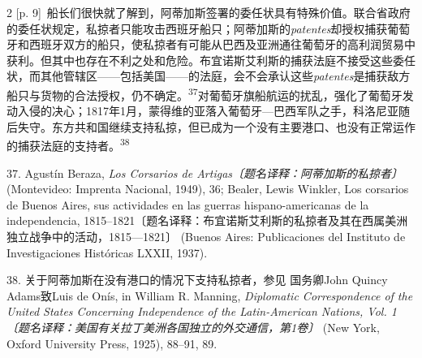 \documentclass[10pt,a4paper]{article}
\begin{document}
\begin{paracol}{2}
{\scriptsize\color{gray} [p. 9]}\ 船长们很快就了解到，阿蒂加斯签署的委任状具有特殊价值。联合省政府的委任状规定，私掠者只能攻击西班牙船只；阿蒂加斯的\textit{patentes}却授权捕获葡萄牙和西班牙双方的船只，使私掠者有可能从巴西及亚洲通往葡萄牙的高利润贸易中获利。但其中也存在不利之处和危险。布宜诺斯艾利斯的捕获法庭不接受这些委任状，而其他管辖区——包括美国——的法庭，会不会承认这些\textit{patentes}是捕获敌方船只与货物的合法授权，仍不确\mbox{定。\textsuperscript{37}}对葡萄牙旗船航运的扰乱，强化了葡萄牙发动入侵的决心；1817年1月，蒙得维的亚落入葡萄牙—巴西军队之手，科洛尼亚随后失守。东方共和国继续支持私掠，但已成为一个没有主要港口、也没有正常运作的捕获法庭的支持\mbox{者。\textsuperscript{38}}\par{\small 37. Agustín Beraza, \textit{Los Corsarios de Artigas〔题名译释：阿蒂加斯的私掠者〕} (Montevideo: Imprenta Nacional, 1949), 36; Bealer, Lewis Winkler, Los corsarios de Buenos Aires, sus actividades en las guerras hispano-americanas de la independencia, 1815–1821〔题名译释：布宜诺斯艾利斯的私掠者及其在西属美洲独立战争中的活动，1815—1821〕 (Buenos Aires: Publicaciones del Instituto de Investigaciones Históricas LXXII, 1937).\par}{\small 38. 关于阿蒂加斯在没有港口的情况下支持私掠者，参见 国务卿John Quincy Adams致Luis de Onís, in William R. Manning, \textit{Diplomatic Correspondence of the United States Concerning Independence of the Latin-American Nations, Vol. 1〔题名译释：美国有关拉丁美洲各国独立的外交通信，第1卷〕} (New York, Oxford University Press, 1925), 88–91, 89.\par}
\switchcolumn

\end{paracol}
\end{document}
